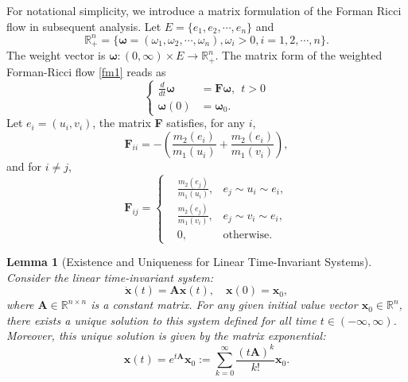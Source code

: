 \documentclass{article}
\newtheorem{lemma}{Lemma}[section]
\newtheorem{example}{Example}
\begin{document}

 For notational simplicity, we introduce a matrix formulation of the Forman Ricci flow  in subsequent analysis. Let $E=\{e_1,e_2,\cdots,e_{n}\}$ and 
\[\mathbb{R}_+^{n}=\{\bm{\omega}=(\omega_1,\omega_2,\cdots,\omega_{n}),\omega_i>0, i=1,2,\cdots, n\}.\]
The weight vector is $\bm{\omega}:(0,\infty)\times E\rightarrow \mathbb{R}_+^{n}.$ The matrix form of the weighted Forman-Ricci flow \eqref{fm1} reads as
\begin{equation}\label{flow0}
\left\{\begin{aligned}
   \frac{d}{dt} \bm{\omega}&=\textbf{F}\bm{\omega},~~ t>0\\
    \bm{\omega}(0)&=\bm{\omega}_0.
\end{aligned}
  \right.
  \end{equation}
Let $e_i=(u_i,v_i)$, the matrix \textbf{F} satisfies, for any $i$,
\[\textbf{F}_{ii}=-\left(\frac{m_2(e_i)}{m_1(u_i)}+\frac{m_2(e_i)}{m_1(v_i)}\right),\]
and for $i\neq j$,
\[\textbf{F}_{ij}=\left\{\begin{aligned}
   &\frac{m_2(e_j)}{m_1(u_i)},& e_j\sim u_i\sim e_i,\\
   &\frac{m_2(e_j)}{m_1(v_i)},& e_j\sim v_i\sim e_i,\\
   &0,& \mbox{otherwise}.
\end{aligned}
  \right.\] 


\begin{lemma}[Existence and Uniqueness for Linear Time-Invariant Systems]\label{th:ex}
Consider the linear time-invariant system:
\begin{equation*}\label{linear}
\dot{\bm x}(t) = \textbf{A} \bm x(t), \quad \bm x(0) = \bm x_0,
\end{equation*}
where \( \textbf{A} \in \mathbb{R}^{n\times n}\) is a constant matrix. For any given initial value vector \( \bm x_0 \in \mathbb{R}^n\), there exists a unique solution to this system defined for all time \( t \in (-\infty, \infty) \).
   Moreover, this unique solution is given by the matrix exponential:
    \[
      \bm x(t) = e^{t\bm A} \bm x_0:= \sum_{k=0}^{\infty} \frac{(t\bm A)^k}{k!}\bm x_0.  
    \]
\end{lemma}
\end{document}
